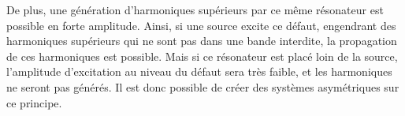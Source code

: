 De plus, une génération d'harmoniques supérieurs par ce même résonateur est possible en forte amplitude. Ainsi, si une source excite ce défaut, engendrant des harmoniques supérieurs qui ne sont pas dans une bande interdite, la propagation de ces harmoniques est possible. Mais si ce résonateur est placé loin de la source, l'amplitude d'excitation au niveau du défaut sera très faible, et les harmoniques ne seront pas générés. Il est donc possible de créer des systèmes asymétriques sur ce principe.







